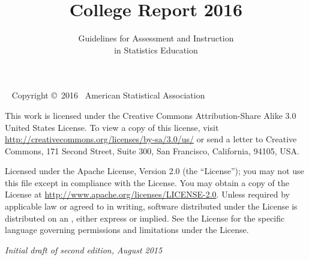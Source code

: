 \documentclass[twoside,openany]{tufte-book}
\title[GAISE College Report 2016]{College Report 2016}
\author[Guidelines for Assessment and Instruction in Statistics Education]{Guidelines for Assessment and Instruction\\ \noindent in Statistics Education}
\begin{document}
\frontmatter




\maketitle


\newpage
\begin{fullwidth}
~\vfill
\thispagestyle{empty}
\setlength{\parindent}{0pt}
\setlength{\parskip}{\baselineskip}
Copyright \copyright\ 2016~ American Statistical Association

\par{}

\par This work is licensed under the Creative Commons Attribution-Share Alike 3.0 United States License. To view a copy of this license, visit \url{http://creativecommons.org/licenses/by-sa/3.0/us/} or send a letter to Creative Commons, 171 Second Street, Suite 300, San Francisco, California, 94105, USA. 

\par{}

\par Licensed under the Apache License, Version 2.0 (the ``License''); you may not
use this file except in compliance with the License. You may obtain a copy
of the License at \url{http://www.apache.org/licenses/LICENSE-2.0}. Unless
required by applicable law or agreed to in writing, software distributed
under the License is distributed on an , either express or implied. See the
License for the specific language governing permissions and limitations
under the License.

\par\textit{Initial draft of second edition, August 2015}
\end{fullwidth}

\tableofcontents


\end{document}
